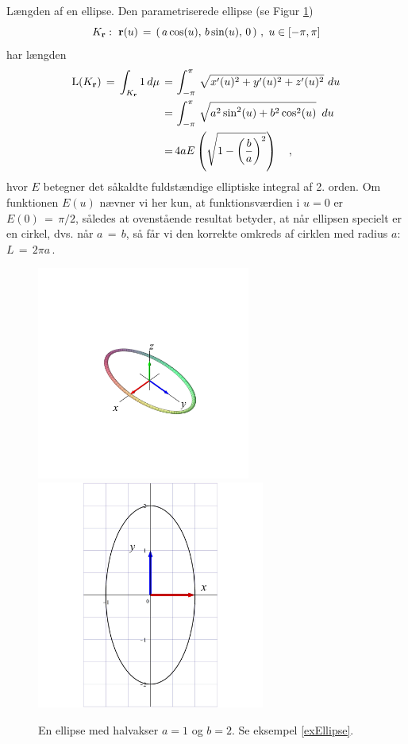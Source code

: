 \begin{example} \label{exEllipse}
{Længden af en ellipse}. Den parametriserede ellipse (se Figur \ref{figEllipse})
$$
K_{\bf r}: \,\, {\bf
r}(u) \, = \, \left(\, a\cos(u), \,b\sin(u), \, 0 \, \right) \, , \, \, u \in
[-\pi, \pi]
$$
har længden
$$
\begin{aligned}
\operatorname{L}(K_{\bf r}) \, = \, \int_{K_{\bf r}} 1 \, d\mu \, = \,
&\int_{-\pi}^{\pi} \,\sqrt{x'(u)^{2} + y'(u)^{2} + z'(u)^{2}}\,\,du \\
\, = \, &\int_{-\pi}^{\pi}\,\sqrt{a^2\sin^2(u) +
b^2\cos^2(u)}\,\,\,du \\
  \, = \, & 4aE\left(\sqrt{1- \left(\frac{b}{a}\right)^2}\right)\quad,
\end{aligned}
$$
hvor $E$ betegner det såkaldte fuldstændige elliptiske integral af 2. orden.
Om funktionen $E(u)$ nævner vi her kun, at funktionsværdien i $u=0$ er $E(0) \, = \, \pi/2$, således at ovenstående resultat betyder, at når ellipsen specielt er en cirkel, dvs. når $a \, = \, b$, så får vi den korrekte
omkreds af cirklen med radius $a$: $L\, = \, 2\pi a \,$.
\end{example}



\begin{figure}[ht]
\centerline{\includegraphics[height=70mm]{FIGS/plotEllipse}\, \, \, \includegraphics[height=75mm]{FIGS/plotEllip2d}}
\begin{center}
\caption{\small{En ellipse med halvakser $a=1$ og $b=2$. Se
eksempel \ref{exEllipse}. }} \label{figEllipse}
\end{center}
\end{figure}






